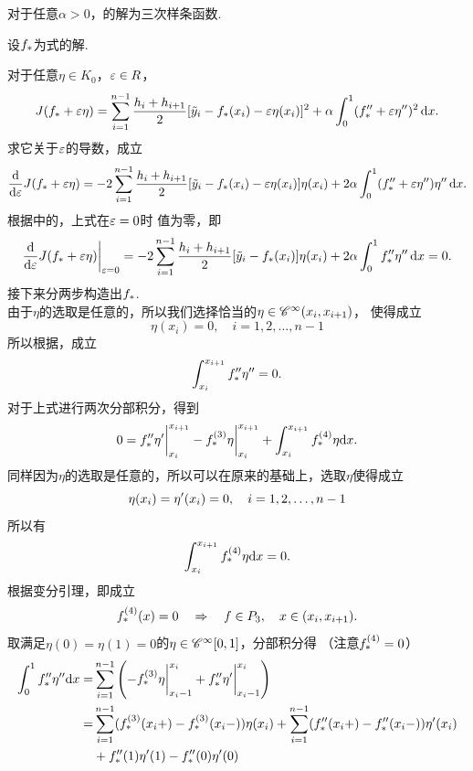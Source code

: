   \begin{thm}
    对于任意$\alpha>0$，的解为三次样条函数.
  \end{thm}
  \proof
    设$\mathnormal{f}_*$为式的解. \par
    对于任意$\eta\in K_0$，$\varepsilon\in R$，
    \[
      J(\mathnormal{f}_*+\varepsilon\eta) = \sum_{i=1}^{n-1}\frac{h_i + h_{i+1}}{2}
      [\tilde{y}_i - f_*(x_i) - \varepsilon\eta(x_i)]^2 + \alpha
      \int_0^1(\mathnormal{f}_*^{\prime\prime} + \varepsilon\eta^{\prime\prime})^2\,\mathrm{d} x.
    \]
    求它关于$\varepsilon$的导数，成立
    \[
      \frac{\mathrm{d}}{\mathrm{d}\varepsilon}J(\mathnormal{f}_*+\varepsilon\eta) =
      -2\sum_{i=1}^{n-1}\frac{h_i+h_{i+1}}{2}[\tilde{y}_i-\mathnormal{f}_*(x_i)-\varepsilon\eta(x_i)]\eta(x_i)
      +2\alpha\int_0^1 (\mathnormal{f}_*^{\prime\prime}+\varepsilon\eta^{\prime\prime})\eta^{\prime\prime} \,\mathrm{d} x.
    \]
    根据中的，上式在$\varepsilon=0$时
    值为零，即
    \begin{equation}
      \label{equ: 正则化证明1}
      \frac{\mathrm{d}}{\mathrm{d}\varepsilon}J(\mathnormal{f}_*+\varepsilon\eta)\bigg|_{\varepsilon=0} =
      -2\sum_{i=1}^{n-1}\frac{h_i+h_{i+1}}{2}[\tilde{y}_i-\mathnormal{f}_*(x_i)]\eta(x_i)
      +2\alpha\int_0^1\mathnormal{f}_*^{\prime\prime}\eta^{\prime\prime}\,\mathrm{d} x = 0.
    \end{equation}
    接下来分两步构造出$\mathnormal{f}_*$.\\
    由于$\eta$的选取是任意的，所以我们选择恰当的$\eta\in\mathscr{C}^\infty(x_i,x_{i+1})$，
    使得成立
    \[
      \eta(x_i) = 0,\quad i = 1,2,\dots,n-1
    \]
    所以根据，成立
    \[
      \int_{x_i}^{x_{i+1}}\mathnormal{f}_*^{\prime\prime}\eta^{\prime\prime} = 0.
    \]
    对于上式进行两次分部积分，得到
    \[
      0 = \mathnormal{f}_*^{\prime\prime}\eta^\prime\bigg|_{x_i}^{x_{i+1}} -
      \mathnormal{f}_*^{(3)}\eta\bigg|_{x_i}^{x_{i+1}} +
      \int_{x_i}^{x_{i+1}}\mathnormal{f}_*^{(4)}\eta\mathrm{d} x.
    \]
    同样因为$\eta$的选取是任意的，所以可以在原来的基础上，选取$\eta$使得成立
    \[
      \eta(x_i) = \eta^\prime(x_i) = 0,\quad i = 1,2,\dots,n-1
    \]
    所以有
    \[
      \int_{x_i}^{x_{i+1}}\mathnormal{f}_*^{(4)}\eta\mathrm{d} x = 0.
    \]
    根据变分引理，即成立
    \begin{equation}
      \label{equ: 正则化证明2}
      \mathnormal{f}_*^{(4)}(x) = 0\quad\Rightarrow\quad \mathnormal{f}\in P_3,\quad x\in(x_i,x_{i+1}).
    \end{equation}
    取满足$\eta(0)=\eta(1)=0$的$\eta\in\mathscr{C}^\infty[0, 1]$，分部积分得
    （注意$\mathnormal{f}_*^{(4)} = 0$）
    \[\begin{split}
      \int_0^1 \mathnormal{f}_*^{\prime\prime}\eta^{\prime\prime}\mathrm{d} x =&
      \sum_{i=1}^{n-1}
      \left(
        -\mathnormal{f}_*^{(3)}\eta\bigg|_{x_i-1}^{x_i}
        +\mathnormal{f}_*^{\prime\prime}\eta^\prime\bigg|_{x_i-1}^{x_i}
      \right) \\
      =& \sum_{i=1}^{n-1}
      ( \mathnormal{f}_*^{(3)}(x_i+) - \mathnormal{f}_*^{(3)}(x_i-))\eta(x_i) +
      \sum_{i=1}^{n-1} ( \mathnormal{f}_*^{\prime\prime}(x_i+) - \mathnormal{f}_*^{\prime\prime}(x_i-))\eta^\prime(x_i)\\
      & + \mathnormal{f}_*^{\prime\prime}(1)\eta^\prime(1) - \mathnormal{f}_*^{\prime\prime}(0)\eta^\prime(0)
    \end{split}\]
